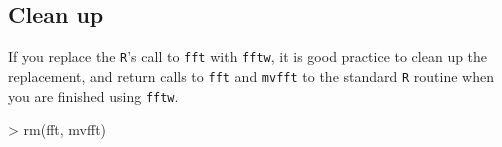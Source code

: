 \documentclass{article}
\begin{document}
\subsection{Clean up}

If you replace the \texttt{R}'s call to \texttt{fft} with \texttt{fftw}, it is good practice to clean up the replacement, and return calls to \texttt{fft} and \texttt{mvfft} to the standard \texttt{R} routine when you are finished using \texttt{fftw}.

\begin{Schunk}
\begin{Sinput}
> rm(fft, mvfft)
\end{Sinput}
\end{Schunk}
\end{document}
